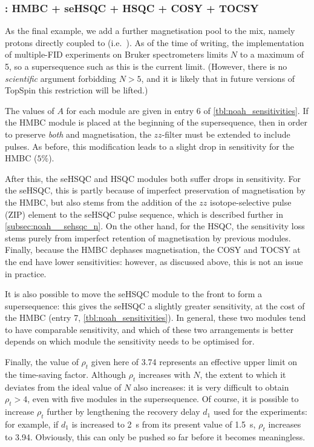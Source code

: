 \subsubsection{: HMBC + \nitrogen{} seHSQC + HSQC + COSY + TOCSY}

As the final example, we add a further magnetisation pool to the mix, namely protons directly coupled to \nitrogen{} (i.e.\ ).
As of the time of writing, the implementation of multiple-FID experiments on Bruker spectrometers limits $N$ to a maximum of 5, so a supersequence such as this  is the current limit.
(However, there is no \textit{scientific} argument forbidding $N > 5$, and it is likely that in future versions of TopSpin this restriction will be lifted.)

The values of $A$ for each module are given in entry 6 of \cref{tbl:noah_sensitivities}.
If the HMBC module is placed at the beginning of the supersequence, then in order to preserve \textit{both}  and  magnetisation, the $zz$-filter must be extended to include \nitrogen{} pulses\autocite{Kupce2019JMR}.
As before, this modification leads to a slight drop in sensitivity for the HMBC ($5\%$).

After this, the \nitrogen{} seHSQC and \carbon{} HSQC modules both suffer drops in sensitivity.
For the \nitrogen{} seHSQC, this is partly because of imperfect preservation of  magnetisation by the HMBC, but also stems from the addition of the $zz$ isotope-selective pulse (ZIP) element to the seHSQC pulse sequence, which is described further in \cref{subsec:noah__sehsqc_n}.
On the other hand, for the \carbon{} HSQC, the sensitivity loss stems purely from imperfect retention of  magnetisation by previous modules.
Finally, because the HMBC dephases  magnetisation, the COSY and TOCSY at the end have lower sensitivities: however, as discussed above, this is not an issue in practice.

It is also possible to move the \nitrogen{} seHSQC module to the front to form a  supersequence: this gives the \nitrogen{} seHSQC a slightly greater sensitivity, at the cost of the HMBC (entry 7, \cref{tbl:noah_sensitivities}).
In general, these two modules tend to have comparable sensitivity, and which of these two arrangements is better depends on which module the sensitivity needs to be optimised for.

Finally, the value of $\rho_t$ given here of 3.74 represents an effective upper limit on the time-saving factor.
Although $\rho_t$ increases with $N$, the extent to which it deviates from the ideal value of $N$ also increases: it is very difficult to obtain $\rho_t > 4$, even with five modules in the supersequence.
Of course, it is possible to increase $\rho_t$ further by lengthening the recovery delay $d_1$ used for the experiments: for example, if $d_1$ is increased to \qty{2}{\s} from its present value of \qty{1.5}{\s}, $\rho_t$ increases to 3.94.
Obviously, this can only be pushed so far before it becomes meaningless.
